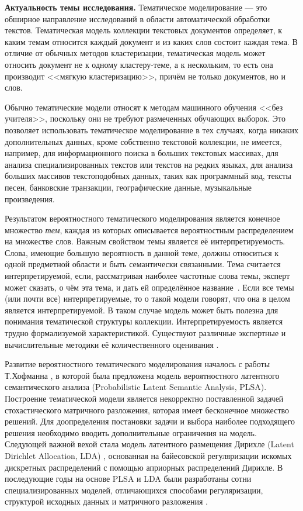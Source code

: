 
\textbf{Актуальность темы исследования.}
Тематическое моделирование --- это обширное направление исследований в области автоматической обработки текстов. Тематическая модель коллекции текстовых документов определяет, к каким темам относится каждый документ и из каких слов состоит каждая тема. В отличие от обычных методов кластеризации, тематическая модель может относить документ не к одному кластеру-теме, а к нескольким, то есть  она производит <<мягкую кластеризацию>>, причём не только документов, но и слов.

Обычно тематические модели относят к методам машинного обучения <<без учителя>>, поскольку они не требуют размеченных обучающих выборок. Это позволяет использовать тематическое моделирование в тех случаях, когда никаких дополнительных данных, кроме собственно текстовой коллекции, не имеется, например, для информационного поиска в больших текстовых массивах, для анализа специализированных текстов или текстов на редких языках, для анализа больших массивов текстоподобных данных, таких как программный код, тексты песен, банковские транзакции, географические данные, музыкальные произведения.

Результатом вероятностного тематического моделирования является конечное множество \textit{тем}, каждая из которых описывается вероятностным распределением на множестве слов. Важным свойством темы является её интерпретируемость. Слова, имеющие большую вероятность в данной теме, должны относиться к одной предметной области и быть семантически связанными. Тема считается интерпретируемой, если, рассматривая наиболее частотные слова темы, эксперт может сказать, о чём эта тема, и дать ей определённое название~\cite{rtl}. Если все темы (или почти все) интерпретируемые, то о такой модели говорят, что она в целом является интерпретируемой. В таком случае модель может быть полезна для понимания тематической структуры коллекции. Интерпретируемость является трудно формализуемой характеристикой. Существуют различные экспертные и вычислительные методики её количественного оценивания \cite{newman2010automatic}.

Развитие вероятностного тематического моделирования началось с работы Т.Хофманна \cite{hofmann1999}, в которой была предложена модель вероятностного латентного семантического анализа (Probabilistic Latent Semantic Analysis, PLSA). Построение тематической модели является некорректно поставленной задачей стохастического матричного разложения, которая имеет бесконечное множество решений. Для доопределения постановки задачи и выбора наиболее подходящего решения необходимо вводить дополнительные ограничения на модель. Следующей важной вехой стала модель латентного размещения Дирихле (Latent Dirichlet Allocation, LDA) \cite{blei2003latent}, основанная на байесовской регуляризации искомых дискретных распределений с помощью априорных распределений Дирихле. В последующие годы на основе PLSA и LDA были разработаны сотни специализированных моделей, отличающихся способами регуляризации, структурой исходных данных и матричного разложения \cite{daud10knowledge,blei2012,fntir2017applications}.

